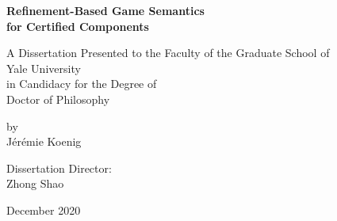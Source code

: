 \documentclass[draft,11pt]{report}
\begin{document}
\begin{titlepage} %
  \large
  \centering

  \vspace*{0in}
  {\Huge \bf Refinement-Based Game Semantics \\ for Certified Components}

  \vfill
  A Dissertation
  Presented to the Faculty of the Graduate School
  of \\
  {\Large Yale University} \\
  in Candidacy for the Degree of \\
  {\Large Doctor of Philosophy}

  \vfill
  by \\
  {\Large J\'er\'emie Koenig}

  \vfill
  Dissertation Director: \\
  {\Large Zhong Shao}

  \vfill
  December 2020
\end{titlepage}
\end{document}
